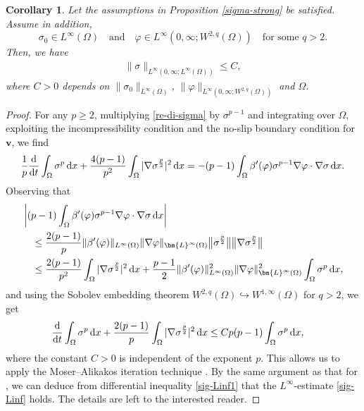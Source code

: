 \documentclass[11pt,reqno]{amsart}
\newtheorem{corollary}{\textbf{Corollary}}[section]
\def\d{{\rm d}}
\def\ddt{\frac{\d}{\d t}}
\def\vv{\bm{v}}
\begin{document}
\begin{corollary}
\label{non-blowup}
Let the assumptions in Proposition \ref{sigma-strong} be satisfied. Assume in addition,
$$\sigma_0\in L^\infty(\Omega)\quad \text{and}\quad \varphi\in L^\infty(0,\infty;W^{2,q}(\Omega))\quad \text{for some }q>2.$$
Then, we have
%
\begin{align}
\|\sigma\|_{L^\infty(0,\infty;L^\infty(\Omega))}\leq C,
\label{sig-Linf}
\end{align}
%
where $C>0$ depends on $\|\sigma_0\|_{L^\infty(\Omega)}$, $\|\varphi\|_{L^\infty(0,\infty;W^{2,q}(\Omega))}$ and $\Omega$.
\end{corollary}
%
\begin{proof}
For any $p\geq 2$, multiplying \eqref{re-di-sigma} by $\sigma^{p-1}$ and integrating over $\Omega$, exploiting the incompressibility condition and the no-slip boundary condition for $\vv$, we find
%
\begin{equation}
\frac{1}{p} \ddt \int_\Omega \sigma^p \, \d x +\frac{4(p-1)}{p^2}  \int_{\Omega}|\nabla \sigma^\frac{p}{2}|^2 \, \d x
= -(p-1) \int_{\Omega}\beta'(\varphi) \sigma^{p-1} \nabla \varphi \cdot \nabla \sigma \, \d x.
\notag
\end{equation}
%
Observing that
%
\begin{align*}
& \left|(p-1) \int_{\Omega} \beta'(\varphi)  \sigma^{p-1} \nabla \varphi \cdot \nabla \sigma \, \d x \right|
\notag \\
& \quad \leq \frac{2(p-1)}{p} \|\beta'(\varphi)\|_{L^\infty(\Omega)}\|\nabla \varphi\|_{\bm{L}^\infty(\Omega)}
\big\| \sigma^{\frac{p}{2}}\big\|
\big\|\nabla \sigma^\frac{p}{2}\big\|
\\
&\quad \leq \frac{2(p-1)}{p^2}  \int_{\Omega}|\nabla \sigma^\frac{p}{2}|^2 \, \d x
+ \frac{p-1}{2} \|\beta'(\varphi)\|_{L^\infty(\Omega)}^2\|\nabla \varphi\|_{\bm{L}^\infty(\Omega)}^2
\int_\Omega  \sigma^p\,\mathrm{d}x,
\end{align*}
%
and using the Sobolev embedding theorem $W^{2,q}(\Omega)\hookrightarrow W^{1,\infty}(\Omega)$ for $q>2$, we get
%
\begin{align}
 \ddt \int_\Omega \sigma^p \, \d x
+\frac{2(p-1)}{p}  \int_{\Omega}|\nabla \sigma^\frac{p}{2}|^2 \, \d x
& \leq Cp(p-1)\int_\Omega  \sigma^p\,\mathrm{d}x,
\label{sig-Linf1}
\end{align}
%
where the constant $C>0$ is independent of the exponent $p$. This allows us to apply the Moser--Alikakos iteration technique \cite{Ali79}. By the same argument as that for \cite[Lemma 3.2]{Tao11}, we can deduce from differential inequality \eqref{sig-Linf1} that the $L^\infty$-estimate \eqref{sig-Linf} holds. The details are left to the interested reader.
\end{proof}
\end{document}

